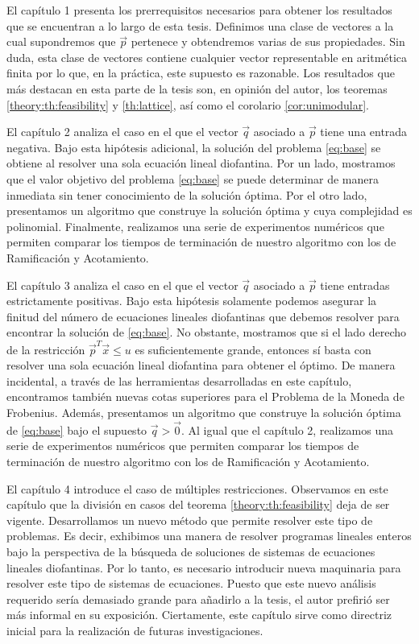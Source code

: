 El capítulo 1 presenta los prerrequisitos necesarios para obtener los resultados que se encuentran a
lo largo de esta tesis. Definimos una clase de vectores a la cual supondremos que $\vec{p}$
pertenece y obtendremos varias de sus propiedades. Sin duda, esta clase de vectores contiene
cualquier vector representable en aritmética finita por lo que, en la práctica, este supuesto es
razonable. Los resultados que más destacan en esta parte de la tesis son, en opinión del autor, los
teoremas \ref{theory:th:feasibility} y \ref{th:lattice}, así como el corolario \ref{cor:unimodular}.

El capítulo 2 analiza el caso en el que el vector $\vec{q}$ asociado a $\vec{p}$ tiene una entrada
negativa. Bajo esta hipótesis adicional, la solución del problema \eqref{eq:base} se obtiene al
resolver una sola ecuación lineal diofantina. Por un lado, mostramos que el valor objetivo del
problema \eqref{eq:base} se puede determinar de manera inmediata sin tener conocimiento de la
solución óptima. Por el otro lado, presentamos un algoritmo que construye la solución óptima y cuya
complejidad es polinomial. Finalmente, realizamos una serie de experimentos numéricos que permiten
comparar los tiempos de terminación de nuestro algoritmo con los de Ramificación y Acotamiento.

El capítulo 3 analiza el caso en el que el vector $\vec{q}$ asociado a $\vec{p}$ tiene entradas
estrictamente positivas. Bajo esta hipótesis solamente podemos asegurar la finitud del número de
ecuaciones lineales diofantinas que debemos resolver para encontrar la solución de \eqref{eq:base}.
No obstante, mostramos que si el lado derecho de la restricción $\vec{p}^T\vec{x} \leq u$ es
suficientemente grande, entonces sí basta con resolver una sola ecuación lineal diofantina para
obtener el óptimo. De manera incidental, a través de las herramientas desarrolladas en este
capítulo, encontramos también nuevas cotas superiores para el Problema de la Moneda de Frobenius.
Además, presentamos un algoritmo que construye la solución óptima de \eqref{eq:base} bajo el
supuesto $\vec{q} > \vec{0}$. Al igual que el capítulo 2, realizamos una serie de experimentos
numéricos que permiten comparar los tiempos de terminación de nuestro algoritmo con los de
Ramificación y Acotamiento.

El capítulo 4 introduce el caso de múltiples restricciones. Observamos en este capítulo que la
división en casos del teorema \ref{theory:th:feasibility} deja de ser vigente. Desarrollamos un
nuevo método que permite resolver este tipo de problemas. Es decir, exhibimos una manera de resolver
programas lineales enteros bajo la perspectiva de la búsqueda de soluciones de sistemas de
ecuaciones lineales diofantinas. Por lo tanto, es necesario introducir nueva maquinaria para resolver
este tipo de sistemas de ecuaciones. Puesto que este nuevo análisis requerido sería demasiado grande
para añadirlo a la tesis, el autor prefirió ser más informal en su exposición. Ciertamente, este
capítulo sirve como directriz inicial para la realización de futuras investigaciones.

